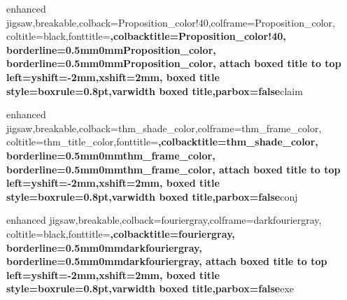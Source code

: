 {enhanced jigsaw,breakable,colback=Proposition_color!40,colframe=Proposition_color,
coltitle=black,fonttitle=\bfseries ,colbacktitle=Proposition_color!40,
borderline={0.5mm}{0mm}{Proposition_color},
borderline={0.5mm}{0mm}{Proposition_color},
attach boxed title to top left={yshift=-2mm,xshift=2mm},
boxed title style={boxrule=0.8pt},varwidth boxed title,parbox=false}{claim}


{enhanced jigsaw,breakable,colback=thm_shade_color,colframe=thm_frame_color,
coltitle=thm_title_color,fonttitle=\bfseries ,colbacktitle=thm_shade_color,
borderline={0.5mm}{0mm}{thm_frame_color},
borderline={0.5mm}{0mm}{thm_frame_color},
attach boxed title to top left={yshift=-2mm,xshift=2mm},
boxed title style={boxrule=0.8pt},varwidth boxed title,parbox=false}{conj}

{enhanced jigsaw,breakable,colback=fouriergray,colframe=darkfouriergray,
coltitle=black,fonttitle=\bfseries ,colbacktitle=fouriergray,
borderline={0.5mm}{0mm}{darkfouriergray},
borderline={0.5mm}{0mm}{darkfouriergray},
attach boxed title to top left={yshift=-2mm,xshift=2mm},
boxed title style={boxrule=0.8pt},varwidth boxed title,parbox=false}{exe}

\renewcommand*\proofname{Beweis}
\makeatletter
\newenvironment{beweis}[1][\proofname]{
	\par
	\pushQED{\qed}%
	\normalfont \topsep6\p@\@plus6\p@\relax
	\trivlist
	\item[\hskip\labelsep
		\bfseries #1\@addpunct{:}]~\newline\ignorespaces
}{
	\popQED\endtrivlist\@endpefalse
	\noindent\ignorespacesafterend
}
\newenvironment{pwoof}[1][\proofname]{
	\par
	\pushQED{\qed}%
	\normalfont \topsep6\p@\@plus6\p@\relax
	\trivlist
	\item[\hskip\labelsep
		\bfseries #1\@addpunct{:}]~\newline\ignorespaces
}{
	\popQED\endtrivlist\@endpefalse
	\noindent\ignorespacesafterend
}
\makeatother



\newsavebox{\informationbox}
\newenvironment{information}
{\begin{center}\begin{lrbox}{\informationbox}\begin{minipage}{0.8\textwidth}\small}
{\end{minipage}\end{lrbox}
\begin{tikzpicture}
\draw[fill] (-0.5*\wd\informationbox - 1cm, - 0.3cm) ellipse (0.3cm and 0.15cm);
\shadedraw[ball color=white] (-0.5*\wd\informationbox -  1cm, 0cm) circle (0.3cm);
\draw[color=black] (-0.5*\wd\informationbox - 1cm + 0.01cm, 0cm) node {\rotatebox{10}{\bfseries i}};

\draw (0,0) node {\usebox{\informationbox}};
\end{tikzpicture}\end{center}
}

